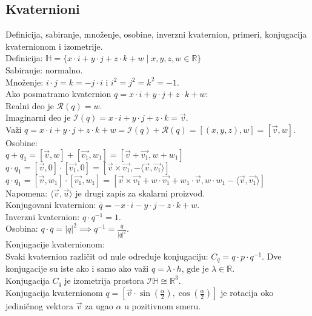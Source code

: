\documentclass[12pt]{article}
\newcommand{\vek}[1]{\overrightarrow{#1}}
\begin{document}
        \subsection{Kvaternioni}
        Definicija, sabiranje, množenje, osobine, inverzni
        kvaternion, primeri, konjugacija kvaternionom i izometrije.
        \\[1cm]
    Definicija: $\mathbb{H}=\{x\cdot i+y\cdot j+z\cdot k+w\mid x,y,z,w\in\mathbb{R}\}$\\
    Sabiranje: normalno.\\
    Množenje: $i\cdot j=k=-j\cdot i$ i $i^2=j^2=k^2=-1$.\\
    Ako posmatramo kvaternion $q=x\cdot i +y\cdot j +z\cdot k+w$:\\
    Realni deo je $\mathcal{R}(q)=w$.\\
    Imaginarni deo je $\mathcal{I}(q)=x\cdot i +y\cdot j +z\cdot k=\vek{v}$.\\
    Važi $q=x\cdot i +y\cdot j +z\cdot k+w=\mathcal{I}(q)+\mathcal{R}(q)=[(x,y,z),w]=[\vek{v},w]$.\\
    Osobine:\\
$q+q_1=[\vek{v},w]+[\vek{v_1},w_1]=[\vek{v}+\vek{v_1},w+w_1]$\\
$q\cdot q_1=[\vek{v},0]\cdot[\vek{v_1},0]=[\vek{v}\times\vek{v_1},-\langle\vek{v},\vek{v_1}\rangle]$\\
$q\cdot q_1=[\vek{v},w_1]\cdot[\vek{v_1},w_1]=[\vek{v}\times\vek{v_1}+w\cdot \vek{v_1}+w_1\cdot\vek{v},w\cdot w_1-\langle\vek{v},\vek{v_1}\rangle]$\\
    Napomena: $\langle\vek{v},\vek{u}\rangle$ je drugi zapis za skalarni proizvod.\\
    Konjugovani kvaternion: $\overline{q}=-x\cdot i -y\cdot j -z\cdot k+w$.\\
    Inverzni kvaternion: $q\cdot q^{-1}=1$.\\
    Osobina: $q\cdot \overline{q}=|q|^2 \implies q^{-1}=\frac{\overline{q}}{|q|^2}$.\\
    Konjugacije kvaternionom:\\
    Svaki kvaternion različit od nule određuje konjugaciju: $C_q=q\cdot p \cdot q^{-1}$.
    Dve konjugacije su iste ako i samo ako važi $q=\lambda\cdot h$, gde je $\lambda\in\mathbb{R}$.\\
    Konjugacija $C_q$ je izometrija prostora $\mathcal{I}\mathbb{H}\cong\mathbb{R}^3$.\\
    Konjugacija kvaternionom $q=[\vek{v}\cdot\sin(\frac{\alpha}{2}),\cos(\frac{\alpha}{2})]$
    je rotacija oko jediničnog vektora $\vek{v}$
    za ugao $\alpha$ u pozitivnom smeru.
    \par
\end{document}
